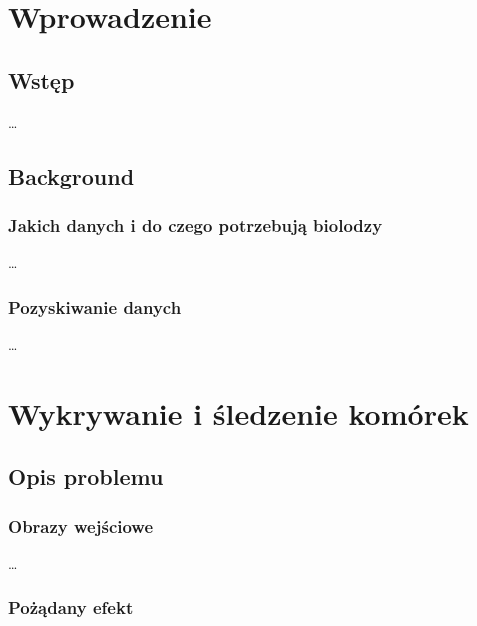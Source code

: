 \documentclass[declaration,shortabstract,mgr]{iithesis}
\author         {Artur Rosa}
\begin{document}

\chapter{Wprowadzenie}

\section{Wstęp}

\ldots %

\section{Background}

\subsection{Jakich danych i do czego potrzebują biolodzy}

\ldots %

\subsection{Pozyskiwanie danych}

\ldots %



\chapter{Wykrywanie i śledzenie komórek}

\section{Opis problemu}
\label{sec:problem}

\subsection{Obrazy wejściowe}
\label{sec:input-images}

\ldots %

\subsection{Pożądany efekt}
\label{sec:output}
\end{document}
